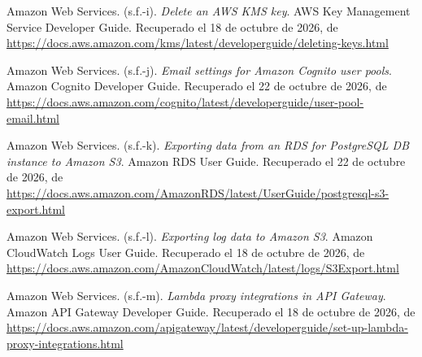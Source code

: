 \documentclass[12pt, a4paper]{article}
\begin{document}
\begin{list}{}{\setlength{\leftmargin}{1.27cm}\setlength{\itemindent}{-1.27cm}%
  \setlength{\labelwidth}{0pt}\setlength{\labelsep}{0pt}\setlength{\itemsep}{6pt}}
 
\item Amazon Web Services. (s.f.-i). \textit{Delete an AWS KMS key}.
  AWS Key Management Service Developer Guide. Recuperado el 18 de octubre de 2026, de \url{https://docs.aws.amazon.com/kms/latest/developerguide/deleting-keys.html}
 
 
\item Amazon Web Services. (s.f.-j). \textit{Email settings for Amazon
  Cognito user pools}. Amazon Cognito Developer Guide. Recuperado el 22 de octubre de 2026, de \url{https://docs.aws.amazon.com/cognito/latest/developerguide/user-pool-email.html}
 
 
\item Amazon Web Services. (s.f.-k). \textit{Exporting data from an RDS
  for PostgreSQL DB instance to Amazon S3}. Amazon RDS User Guide. Recuperado el 22 de octubre de 2026, de \url{https://docs.aws.amazon.com/AmazonRDS/latest/UserGuide/postgresql-s3-export.html}
 
 
\item Amazon Web Services. (s.f.-l). \textit{Exporting log data to
  Amazon S3}. Amazon CloudWatch Logs User Guide. Recuperado el 18 de octubre de 2026, de \url{https://docs.aws.amazon.com/AmazonCloudWatch/latest/logs/S3Export.html}

 
\item Amazon Web Services. (s.f.-m). \textit{Lambda proxy integrations
  in API Gateway}. Amazon API Gateway Developer Guide. Recuperado el 18 de octubre de 2026, de \url{https://docs.aws.amazon.com/apigateway/latest/developerguide/set-up-lambda-proxy-integrations.html}
 
 

\end{list}
\end{document}
